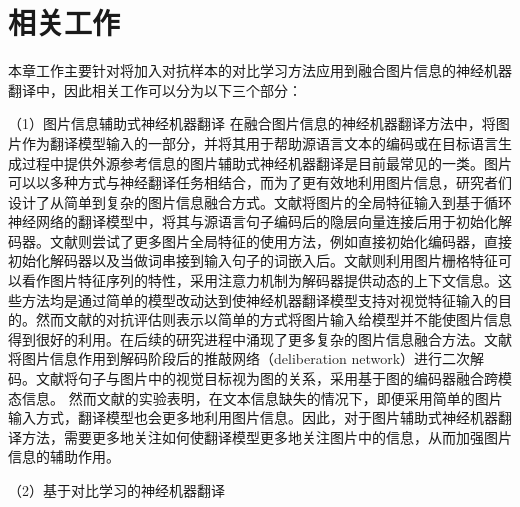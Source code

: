 \section{相关工作}
本章工作主要针对将加入对抗样本的对比学习方法应用到融合图片信息的神经机器翻译中，因此相关工作可以分为以下三个部分：

{\sffamily （1）图片信息辅助式神经机器翻译}
在融合图片信息的神经机器翻译方法中，将图片作为翻译模型输入的一部分，并将其用于帮助源语言文本的编码或在目标语言生成过程中提供外源参考信息的图片辅助式神经机器翻译是目前最常见的一类。图片可以以多种方式与神经翻译任务相结合，而为了更有效地利用图片信息，研究者们设计了从简单到复杂的图片信息融合方式。文献\cite{52_DBLP:journals/corr/ElliottFH15}将图片的全局特征输入到基于循环神经网络的翻译模型中，将其与源语言句子编码后的隐层向量连接后用于初始化解码器。文献\cite{18_DBLP:conf/emnlp/CalixtoL17}则尝试了更多图片全局特征的使用方法，例如直接初始化编码器，直接初始化解码器以及当做词串接到输入句子的词嵌入后。文献\cite{36_calixto-etal-2017-doubly,47_DBLP:conf/wmt/LibovickyHM18}则利用图片栅格特征可以看作图片特征序列的特性，采用注意力机制为解码器提供动态的上下文信息。这些方法均是通过简单的模型改动达到使神经机器翻译模型支持对视觉特征输入的目的。然而文献\cite{23_elliott-2018-adversarial}的对抗评估则表示以简单的方式将图片输入给模型并不能使图片信息得到很好的利用。在后续的研究进程中涌现了更多复杂的图片信息融合方法。文献\cite{39_ive-etal-2019-distilling}将图片信息作用到解码阶段后的推敲网络（deliberation network）进行二次解码。文献\cite{33_yin-etal-2020-novel}将句子与图片中的视觉目标视为图的关系，采用基于图的编码器融合跨模态信息。
然而文献\cite{53_caglayan-etal-2019-probing}的实验表明，在文本信息缺失的情况下，即便采用简单的图片输入方式，翻译模型也会更多地利用图片信息。因此，对于图片辅助式神经机器翻译方法，需要更多地关注如何使翻译模型更多地关注图片中的信息，从而加强图片信息的辅助作用。

{\sffamily （2）基于对比学习的神经机器翻译}

